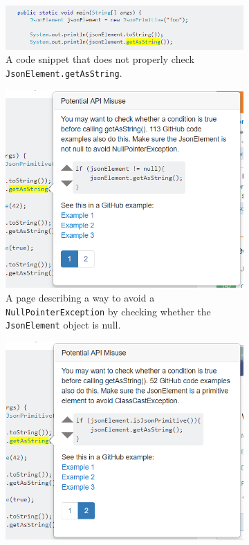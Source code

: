 \begin{figure}
\centering
  \begin{subfigure}[a]{0.48\textwidth}
  \includegraphics[width=\textwidth]{json_ex1.PNG}
  \caption{A code snippet that does not properly check {\tt JsonElement.getAsString}.}
  \vspace{.1in}
  \label{fig:so_example}
  \end{subfigure}
  \hfill
  \begin{subfigure}[b]{0.48\textwidth}
  \includegraphics[width=\textwidth]{json_ex2.PNG}
  \caption{A page describing a way to avoid a {\tt NullPointerException} by checking whether the {\tt JsonElement} object is null.} 
  \vspace{.1in}
  \label{fig:page1}
  \end{subfigure}
  \hfill
  \begin{subfigure}[c]{0.48\textwidth}
  \includegraphics[width=\textwidth]{json_ex3.PNG}

\end{subfigure}
\end{figure}
